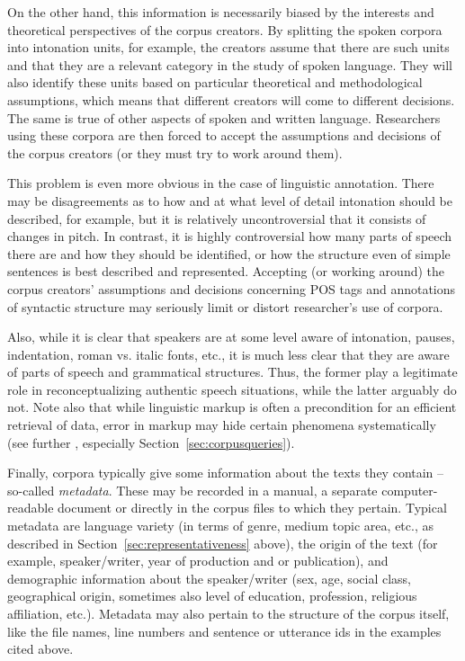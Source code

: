 On the other hand, this information is necessarily biased by the interests and theoretical perspectives of the corpus creators. By splitting the spoken corpora into intonation  units, for example, the creators assume that there are such units and that they are a relevant category in the study of spoken  language. They will also identify these units based on particular theoretical and methodological assumptions, which means that different creators will come to different decisions. The same is true of other aspects of spoken  and written language. Researchers using these corpora are then forced to accept the assumptions and decisions of the corpus creators (or they must try to work around them).

This problem is even more obvious in the case of linguistic annotation.  There may be disagreements as to how and at what level of detail intonation should be described, for example, but it is relatively uncontroversial that it consists of changes in pitch. In contrast, it is highly controversial how many parts of speech there are and how they should be identified, or how the structure even of simple sentences is best described and represented. Accepting (or working around) the corpus creators' assumptions and decisions concerning POS tags and annotations  of syntactic  structure may seriously limit or distort researcher's use of corpora.

Also, while it is clear that speakers are at some level aware of intonation,  pauses, indentation, roman vs. italic fonts, etc., it is much less clear that they are aware of parts of speech and grammatical structures. Thus, the former play a legitimate role in reconceptualizing authentic  speech situations, while the latter arguably do not. Note also that while linguistic markup  is often a precondition for an efficient retrieval  of data, error in markup  may hide certain phenomena systematically (see further , especially Section~\ref{sec:corpusqueries}).

Finally, corpora typically give some information about the texts they contain -- so\hyp{}called \textit{metadata}.  These may be recorded in a manual, a separate computer\hyp{}readable document or directly in the corpus files to which they pertain. Typical metadata are language variety  (in terms of genre,  medium  topic area, etc., as described in Section~\ref{sec:representativeness} above), the origin of the text (for example, speaker\slash writer, year of production and or publication), and demographic  information about the speaker\slash writer (sex, age,  social class, geographical origin, sometimes also level of education, profession, religious affiliation, etc.). Metadata  may also pertain to the structure of the corpus itself, like the file names, line numbers and sentence or utterance ids in the examples cited above.

